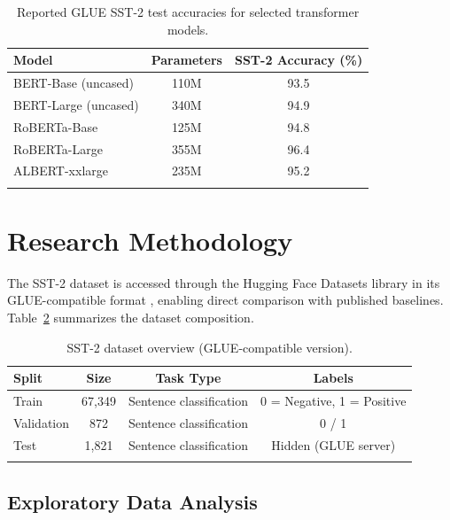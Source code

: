 \documentclass[pdflatex,sn-mathphys-num]{sn-jnl}
\theoremstyle{thmstyleone}%
\theoremstyle{thmstyletwo}%
\theoremstyle{thmstylethree}%
\begin{document}
\begin{table}[h]
\centering
\begin{tabular}{@{}lcc@{}}
\toprule
\textbf{Model} & \textbf{Parameters} & \textbf{SST-2 Accuracy (\%)} \\
\midrule
BERT-Base (uncased) \cite{devlin2019bert}   & 110M & 93.5 \\
BERT-Large (uncased) \cite{devlin2019bert}  & 340M & 94.9 \\
RoBERTa-Base \cite{liu2019roberta}          & 125M & 94.8 \\
RoBERTa-Large \cite{liu2019roberta}         & 355M & 96.4 \\
ALBERT-xxlarge \cite{lan2020albert}         & 235M & 95.2 \\
\botrule
\end{tabular}
\caption{Reported GLUE SST-2 test accuracies for selected transformer models.}
\label{tab:sst2_baselines}
\end{table}

\section{Research Methodology}\label{sec3}

The SST-2 dataset \cite{socher2013sst} is accessed through the Hugging Face Datasets library \cite{lhoest2021datasets} in its GLUE-compatible format \cite{wang2018glue}, enabling direct comparison with published baselines. Table~\ref{tab:sst2_overview} summarizes the dataset composition.

\begin{table}[h]
\centering
\begin{tabular}{@{}lccc@{}}
\toprule
\textbf{Split} & \textbf{Size} & \textbf{Task Type} & \textbf{Labels} \\
\midrule
Train      & 67{,}349 & Sentence classification & 0 = Negative, 1 = Positive \\
Validation &   872    & Sentence classification & 0 / 1 \\
Test       & 1{,}821  & Sentence classification & Hidden (GLUE server) \\
\botrule
\end{tabular}
\caption{SST-2 dataset overview (GLUE-compatible version).}
\label{tab:sst2_overview}
\end{table}

\subsection{Exploratory Data Analysis}
\end{document}
